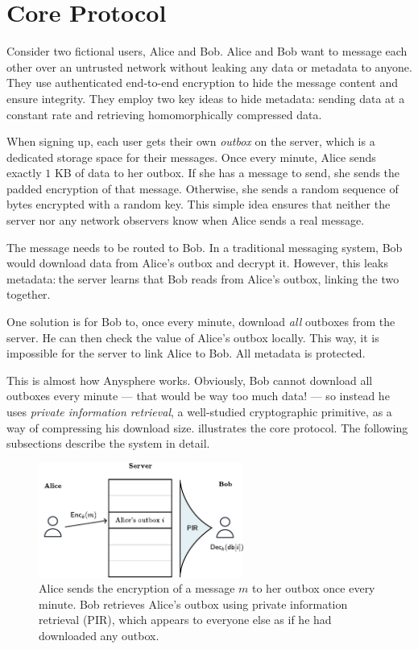 \section{Core Protocol}
\label{sec:coreprotocol}

Consider two fictional users, Alice and Bob. Alice and Bob want to message each other over an untrusted network without leaking any data or metadata to anyone. They use authenticated end-to-end encryption to hide the message content and ensure integrity. They employ two key ideas to hide metadata: sending data at a constant rate and retrieving homomorphically compressed data.

When signing up, each user gets their own \textit{outbox} on the server, which is a dedicated storage space for their messages. Once every minute, Alice sends exactly $1$ KB of data to her outbox. If she has a message to send, she sends the padded encryption of that message. Otherwise, she sends a random sequence of bytes encrypted with a random key. This simple idea ensures that neither the server nor any network observers know when Alice sends a real message.

The message needs to be routed to Bob. In a traditional messaging system, Bob would download data from Alice's outbox and decrypt it. However, this leaks metadata:$~$the server learns that Bob reads from Alice's outbox, linking the two together.

One solution is for Bob to, once every minute, download \textit{all} outboxes from the server. He can then check the value of Alice's outbox locally. This way, it is impossible for the server to link Alice to Bob. All metadata is protected.

This is almost how Anysphere works. Obviously, Bob cannot download all outboxes every minute — that would be way too much data! — so instead he uses \textit{private information retrieval}, a well-studied cryptographic primitive, as a way of compressing his download size.  illustrates the core protocol. The following subsections describe the system in detail.

\begin{figure}
    \centering
    \includegraphics[width=0.6\textwidth]{pirfigure.pdf}
\caption{Alice sends the encryption of a message $m$ to her outbox once every minute. Bob retrieves Alice's outbox using private information retrieval (PIR), which appears to everyone else as if he had downloaded any outbox.}
\label{fig:highlevelpir}
\end{figure}

